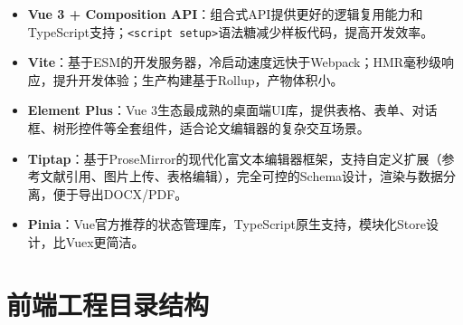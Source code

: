 \begin{itemize}
    \item \textbf{Vue 3 + Composition API}：组合式API提供更好的逻辑复用能力和TypeScript支持；\texttt{<script setup>}语法糖减少样板代码，提高开发效率。
    \item \textbf{Vite}：基于ESM的开发服务器，冷启动速度远快于Webpack；HMR毫秒级响应，提升开发体验；生产构建基于Rollup，产物体积小。
    \item \textbf{Element Plus}：Vue 3生态最成熟的桌面端UI库，提供表格、表单、对话框、树形控件等全套组件，适合论文编辑器的复杂交互场景。
    \item \textbf{Tiptap}：基于ProseMirror的现代化富文本编辑器框架，支持自定义扩展（参考文献引用、图片上传、表格编辑），完全可控的Schema设计，渲染与数据分离，便于导出DOCX/PDF。
    \item \textbf{Pinia}：Vue官方推荐的状态管理库，TypeScript原生支持，模块化Store设计，比Vuex更简洁。
\end{itemize}

\section{前端工程目录结构}


